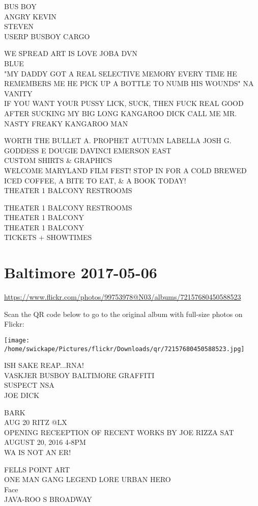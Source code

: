 \documentclass[10pt,letterpaper]{article}
\begin{document}
BUS BOY\\
ANGRY KEVIN\\
STEVEN\\
USERP BUSBOY CARGO

WE SPREAD ART IS LOVE JOBA DVN\\
BLUE\\
"MY DADDY GOT A REAL SELECTIVE MEMORY EVERY TIME HE REMEMBERS ME HE PICK UP A BOTTLE TO NUMB HIS WOUNDS" NA VANITY\\
IF YOU WANT YOUR PUSSY LICK, SUCK, THEN FUCK REAL GOOD AFTER SUCKING MY BIG LONG KANGAROO DICK CALL ME MR. NASTY FREAKY KANGAROO MAN

WORTH THE BULLET A. PROPHET AUTUMN LABELLA JOSH G. GODDESS E DOUGIE DAVINCI EMERSON EAST\\
CUSTOM SHIRTS \& GRAPHICS\\
WELCOME MARYLAND FILM FEST!  STOP IN FOR A COLD BREWED ICED COFFEE, A BITE TO EAT, \& A BOOK TODAY!\\
THEATER 1 BALCONY RESTROOMS

THEATER 1 BALCONY RESTROOMS\\
THEATER 1 BALCONY\\
THEATER 1 BALCONY\\
TICKETS + SHOWTIMES


\section*{Baltimore 2017-05-06}

\url{https://www.flickr.com/photos/99753978@N03/albums/72157680450588523}

Scan the QR code below to go to the original album with full-size photos on Flickr:

\texttt{[image: /home/swickape/Pictures/flickr/Downloads/qr/72157680450588523.jpg]}


ISH SAKE REAP...RNA!\\
VASKJER BUSBOY BALTIMORE GRAFFITI\\
SUSPECT NSA\\
JOE DICK

BARK\\
AUG 20 RITZ @LX\\
OPENING RECEEPTION OF RECENT WORKS BY JOE RIZZA SAT AUGUST 20, 2016 4{-}8PM\\
WA IS NOT AN ER!

FELLS POINT ART\\
ONE MAN GANG LEGEND LORE URBAN HERO\\
Face\\
JAVA{-}ROO S BROADWAY
\end{document}
